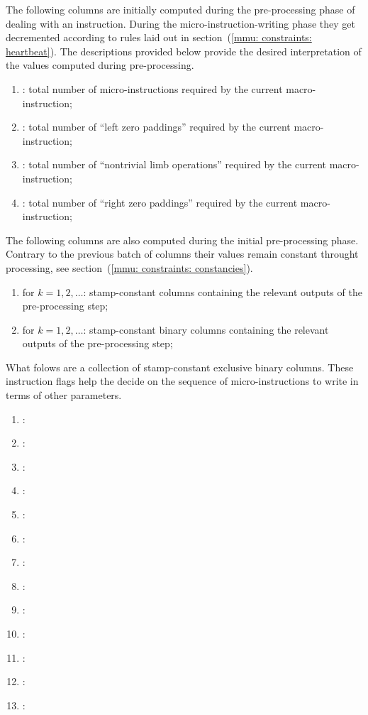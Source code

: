 The following columns are initially computed during the pre-processing phase of dealing with an \mmuMod{} instruction.
During the micro-instruction-writing phase they get decremented according to rules laid out in section~(\ref{mmu: constraints: heartbeat}).
The descriptions provided below provide the desired interpretation of the values computed during pre-processing. 
\begin{enumerate}[resume]
	\item \ppTot:
		total number of micro-instructions required by the current macro-instruction;	
	\item \ppTotLZ:
		total number of ``left zero paddings'' required by the current macro-instruction;	
	\item \ppTotNT:
		total number of ``nontrivial limb operations'' required by the current macro-instruction;
	\item \ppTotRZ:
		total number of ``right zero paddings'' required by the current macro-instruction;	
\end{enumerate}
The following columns are also computed during the initial pre-processing phase.
Contrary to the previous batch of columns their values remain constant throught processing, see section~(\ref{mmu: constraints: constancies}).
\begin{enumerate}[resume]
	\item {} for $k=1, 2, \dots$:
		stamp-constant columns containing the relevant outputs of the pre-processing step;
	\item {} for $k=1, 2, \dots$:
		stamp-constant binary columns containing the relevant outputs of the pre-processing step;
\end{enumerate}
What folows are a collection of stamp-constant exclusive binary columns.
These instruction flags help the \mmuMod{} decide on the sequence of micro-instructions to write in terms of other parameters. 
\begin{enumerate}[resume]
	\item \mmuInstFlagMload{}:
	\item \mmuInstFlagMstore{}:
	\item \mmuInstFlagMstoreEight{}:
	\item \mmuInstFlagInvalidCodePrefix{}:
	\item \mmuInstFlagRightPaddedWordExtraction{}:
	\item \mmuInstFlagRamToExoWithPadding{}:
	\item \mmuInstFlagExoToRamTransplants{}:
	\item \mmuInstFlagRamToRamSansPadding{}:
	\item \mmuInstFlagAnyToRamWithPaddingSomeData{}:
	\item \mmuInstFlagAnyToRamWithPaddingPurePadding{}:
	\item \mmuInstFlagModexpZero{}:
	\item \mmuInstFlagModexpData{}:
	\item \mmuInstFlagBlake{}:
\end{enumerate}
